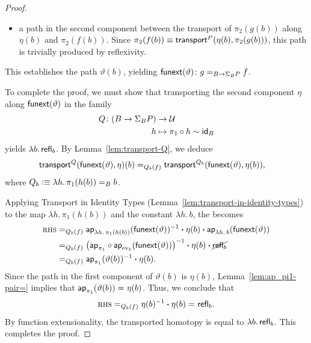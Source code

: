 \begin{proof}
\begin{itemize}
        \item a path in the second component between the transport of $\pi_2(g(b))$ along $\eta(b)$ and $\pi_2(f(b))$. Since $\pi_2(f(b))\equiv\mathsf{transport}^P(\eta(b),\pi_2(g(b)))$, this path is trivially produced by reflexivity.
    \end{itemize}
    This establishes the path $\vartheta(b)$, yielding $\fun{funext}(\vartheta)\colon g\eq{B\to\Sigma_BP}f$.
    
    To complete the proof, we must show that transporting the second component $\eta$ along $\mathsf{funext}(\vartheta)$ in the family
    \begin{align*}
        Q\colon(B\to\Sigma_BP)&\to\univ\\
        h&\mapsto \pi_1\circ h\sim\id_B
    \end{align*}
    yields $\lambda b.\,\mathsf{refl}_b$. By Lemma~\ref{lem:transport-Q}, we deduce
    \begin{align*}
        \mathsf{transport}^Q(\mathsf{funext}(\vartheta),\eta)(b)
            &\mathrel{=_{Q_b(f)}}\mathsf{transport}^{Q_b}
                (\mathsf{funext}(\vartheta),\eta(b)),
    \end{align*}
    where $Q_b\mathrel{\vcentcolon}\equiv\lambda h.\,\pi_1(h(b))\mathrel{=_{B}}b$.
    
    Applying Transport in Identity Types (Lemma~\ref{lem:transport-in-identity-types}) to the map $\lambda h.\,\pi_1(h(b))$ and the constant $\lambda h.\,b$, the \rhs becomes
    \begin{align*}
        \textsc{rhs}
            &\mathrel{=_{Q_b(f)}}
                \mathsf{ap}_{\lambda h.\,\pi_1(h(b))}(
                    \mathsf{funext}(\vartheta)
                )^{-1}
                \mathbin{\boldsymbol{\cdot}}\eta(b)
                \mathbin{\boldsymbol{\cdot}}\mathsf{ap}_{\lambda h.\,b}(
                    \mathsf{funext}(\vartheta)
                )\\
            &\mathrel{=_{Q_b(f)}}
                \bigl(
                    \mathsf{ap}_{\pi_1}\circ\mathsf{ap}_{{\operatorname{ev}}_{b}}
                        (\mathsf{funext}(\vartheta))
                \bigr)^{-1}
                \mathbin{\boldsymbol{\cdot}}\eta(b)
                \mathbin{\boldsymbol{\cdot}}\cancel{\mathsf{refl}_b}\\
            &\mathrel{=_{Q_b(f)}}
                \mathsf{ap}_{\pi_1}(\vartheta(b))^{-1}\mathbin{\boldsymbol{\cdot}}\eta(b).
    \end{align*}
    Since the path in the first component of $\vartheta(b)$ is $\eta(b)$, Lemma~\ref{lem:ap_pi1-pair=} implies that $\mathsf{ap}_{\pi_1}(\vartheta(b))\mathrel{=_{}}\eta(b)$. Thus, we conclude that
    \[
        \textsc{rhs}\mathrel{=_{Q_b(f)}}
            \eta(b)^{-1}\mathbin{\boldsymbol{\cdot}}\eta(b)\mathrel{=_{}}\mathsf{refl}_b.
    \]
    By function extensionality, the transported homotopy is equal to $\lambda b.\,\mathsf{refl}_b$. This completes the proof.
    
\end{proof}

